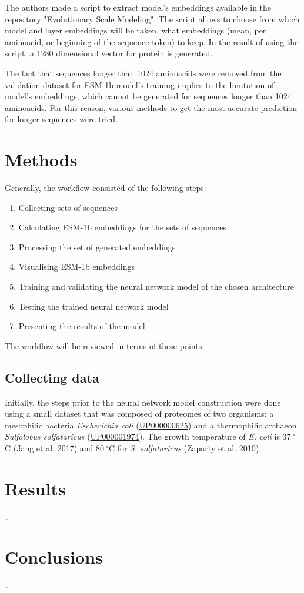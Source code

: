 \documentclass[12pt]{report}
\begin{document}
	The authors made a script to extract model's embeddings available in the 
	repository "Evolutionary Scale Modeling". The script allows to choose 
	from which model and layer embeddings will be taken, what embeddings 
	(mean, per aminoacid, or beginning of the sequence token) to keep. In the
	result of using the script, a 1280 dimensional vector for protein is generated.
	
	The fact that sequences longer than 1024 aminoacids were removed from the 
	validation dataset for ESM-1b model's training implies to the limitation of 
	model's embeddings, which cannot be generated for sequences longer than 
	1024 aminoacids. For this reason, various methods to get the most accurate 
	prediction for longer sequences were tried.

	\newpage

	\section{Methods}

	Generally, the workflow consisted of the following steps:

	\begin{enumerate}
		\item Collecting sets of sequences
		\item Calculating ESM-1b embeddings for the sets of sequences
		\item Processing the set of generated embeddings
		\item Visualising ESM-1b embeddings
		\item Training and validating the neural network model of the chosen architecture 
		\item Testing the trained neural network model
		\item Presenting the results of the model
	\end{enumerate}

	The workflow will be reviewed in terms of these points.

	\subsection{Collecting data}

	Initially, the steps prior to the neural network model construction 
	were done using a small dataset that was composed of proteomes of two 
	organisms: a mesophilic bacteria \textit{Escherichia coli} 
	(\href{https://www.uniprot.org/proteomes/UP000000625}{UP000000625}) and a 
	thermophilic archaeon \textit{Sulfolobus solfataricus} 
	(\href{https://www.uniprot.org/proteomes/UP000001974}{UP000001974}). The 
	growth temperature of \textit{E. coli} is $37\ ^\circ$C (Jang et al. 2017) 
	and $80\ ^\circ$C for \textit{S. solfataricus} (Zaparty et al. 2010).

	\newpage

	\section{Results}

	\dots

	\section{Conclusions}

	\dots

	\nocite{*}
	
	\normalsize

 

\end{document}
